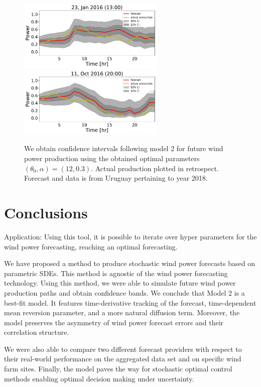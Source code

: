 \documentclass[11pt,english]{article}
\begin{document}
    \begin{figure}[h]
      \includegraphics[width=70mm,scale=1]{confidence_intervals/24hr/31.pdf}
      \includegraphics[width=70mm,scale=1]{confidence_intervals/24hr/820.pdf}
       \caption{We obtain confidence intervals following model 2  for future wind power production using the obtained optimal parameters $(\theta_0, \alpha )=(12,0.3)$. Actual production plotted in retrospect. Forecast and data is from Uruguay pertaining to  year 2018. }
    \end{figure}

\section{Conclusions} \label{Section_8}

{\color{red} Application: Using this tool, it is possible to iterate over hyper parameters for the wind power forecasting, reaching an optimal forecasting.}

We have proposed a method to produce stochastic wind power forecasts based on parametric SDEs. This method is agnostic of the wind power forecasting technology. Using this method, we were able to simulate future wind power production paths and obtain confidence bands. We conclude that Model 2 is a best-fit model. It features time-derivative tracking of the forecast, time-dependent mean reversion parameter, and a more natural diffusion term. Moreover, the model preserves the asymmetry of wind power forecast errors and their correlation structure.

We were also able to compare two different forecast providers with respect to their real-world performance on the aggregated data set and on specific wind farm sites. Finally, the model paves the way for stochastic optimal control methods enabling optimal decision making under uncertainty.


\nocite{*}
 
\printbibliography[keyword={Wind-SDE},title={References}]
\end{document}
